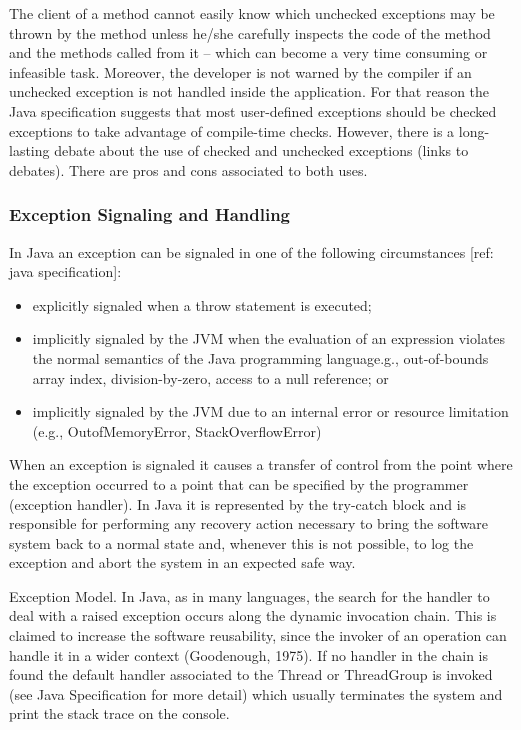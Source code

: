 \documentclass[conference]{IEEEtran}
\begin{document}
The client of a method cannot easily know which unchecked exceptions may be thrown by the method unless he/she carefully inspects the code of the method and the methods called from it – which can become a very time consuming or infeasible task. Moreover, the developer is not warned by the compiler if an unchecked exception is not handled inside the application. For that reason the Java specification suggests that most user-defined exceptions should be checked exceptions to take advantage of compile-time checks. However, there is a long-lasting debate about the use of checked and unchecked exceptions (links to debates). There are pros and cons associated to both uses. 

\subsubsection{Exception Signaling and Handling}

In Java an exception can be signaled in one of the following circumstances [ref: java specification]:

\begin{itemize}
\item  explicitly signaled when a throw statement is executed;
\item  implicitly signaled by the JVM when the evaluation of an expression violates the normal semantics of the Java programming language.g., out-of-bounds array index, division-by-zero, access to a null reference; or 
\item implicitly signaled by the JVM due to an internal error or resource limitation (e.g., OutofMemoryError, StackOverflowError)
\end{itemize}

When an exception is signaled it causes a transfer of control from the point where the exception occurred to a point that can be specified by the programmer (exception handler). In Java it is represented by the try-catch block and is responsible for performing any recovery action necessary to bring the software system back to a normal state and, whenever this is not possible, to log the exception and abort the system in an expected safe way. 

Exception Model. In Java, as in many languages, the search for the handler to deal with a raised exception occurs along the dynamic invocation chain. This is claimed to increase the software reusability, since the invoker of an operation can handle it in a wider context (Goodenough, 1975). If no handler in the chain is found the default handler associated to the Thread or ThreadGroup is invoked (see Java Specification for more detail) which usually terminates the system and print the stack trace on the console.
\end{document}

